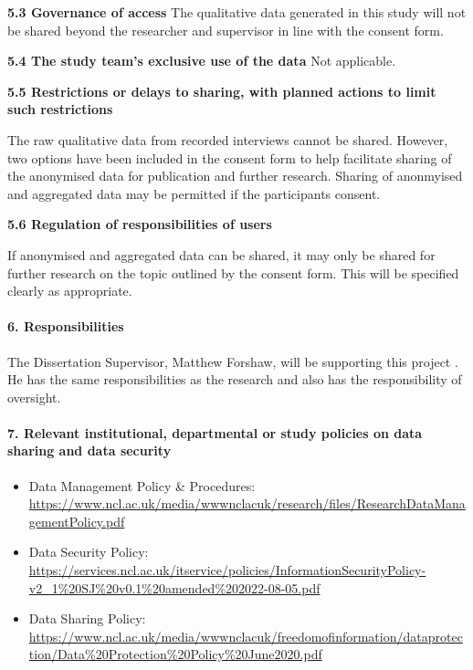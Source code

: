 \documentclass[
]{article}
\begin{document}
\textbf{5.3 Governance of access} The qualitative data generated in this
study will not be shared beyond the researcher and supervisor in line
with the consent form.

\textbf{5.4 The study team's exclusive use of the data} Not applicable.

\textbf{5.5 Restrictions or delays to sharing, with planned actions to
limit such restrictions}

The raw qualitative data from recorded interviews cannot be shared.
However, two options have been included in the consent form to help
facilitate sharing of the anonymised data for publication and further
research. Sharing of anonmyised and aggregated data may be permitted if
the participants consent.

\textbf{5.6 Regulation of responsibilities of users}

If anonymised and aggregated data can be shared, it may only be shared
for further research on the topic outlined by the consent form. This
will be specified clearly as appropriate.

\hypertarget{responsibilities}{%
\paragraph{6. Responsibilities}\label{responsibilities}}

The Dissertation Supervisor, Matthew Forshaw, will be supporting this
project . He has the same responsibilities as the research and also has
the responsibility of oversight.

\hypertarget{relevant-institutional-departmental-or-study-policies-on-data-sharing-and-data-security}{%
\paragraph{7. Relevant institutional, departmental or study policies on
data sharing and data
security}\label{relevant-institutional-departmental-or-study-policies-on-data-sharing-and-data-security}}

\begin{itemize}
\item
  Data Management Policy \& Procedures:
  \url{https://www.ncl.ac.uk/media/wwwnclacuk/research/files/ResearchDataManagementPolicy.pdf}
\item
  Data Security Policy:
  \url{https://services.ncl.ac.uk/itservice/policies/InformationSecurityPolicy-v2_1\%20SJ\%20v0.1\%20amended\%202022-08-05.pdf}
\item
  Data Sharing Policy:
  \url{https://www.ncl.ac.uk/media/wwwnclacuk/freedomofinformation/dataprotection/Data\%20Protection\%20Policy\%20June2020.pdf}
\end{itemize}
\end{document}
